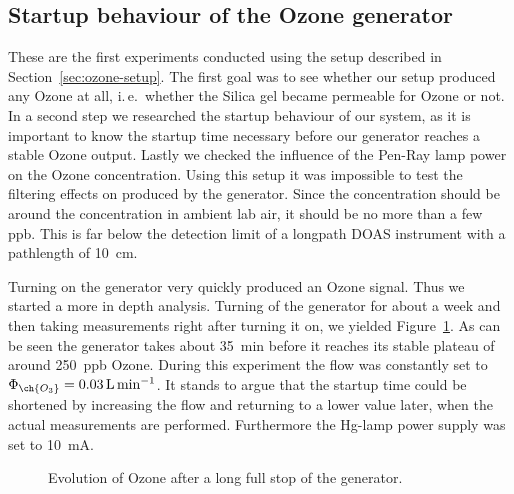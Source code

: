 \subsection{Startup behaviour of the Ozone generator}
\label{sec:ozone}

These are the first experiments conducted using the setup described in
Section~\ref{sec:ozone-setup}. The first goal was to see whether our
setup produced any Ozone at all, i.\,e.\ whether the Silica gel became
permeable for Ozone or not. In a second step we researched the startup
behaviour of our system, as it is important to know the startup time
necessary before our generator reaches a stable Ozone output. Lastly
we checked the influence of the Pen-Ray lamp power on the Ozone
concentration. Using this setup it was impossible to test the
filtering effects on  produced by the generator. Since the
concentration should be around the  concentration in ambient
lab air, it should be no more than a few \si{ppb}. This is far below
the detection limit of a longpath DOAS instrument with a pathlength of
\SI{10}{\centi\meter}. 

Turning on the generator very quickly produced an Ozone signal. Thus
we started a more in depth analysis. Turning of the generator for
about a week and then taking measurements right after turning it on,
we yielded Figure~\ref{fig:long-stop}. As can be seen the generator
takes about \SI{35}{\minute} before it reaches its stable plateau of
around \SI{250}{ppb} Ozone. During this experiment the flow was
constantly set to $\Phi_{\ch{O_3}} = \SI{0.03}{\liter\per\minute}$. It
stands to argue that the startup time could be shortened by increasing
the flow and returning to a lower value later, when the actual 
measurements are performed. Furthermore the Hg-lamp power supply was
set to \SI{10}{\milli\ampere}.

\begin{figure}[htbp]
  \centering
  \caption{Evolution of Ozone after a long full stop of the
    generator.}
  \label{fig:long-stop}
\end{figure}

